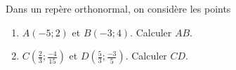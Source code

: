
Dans un repère orthonormal, on considère les points 
\begin{enumerate}
\item $A(-5;2)$ et $B(-3;4)$. Calculer $AB$.
\item $C \left( \frac{2}{3}; \frac{-4}{15} \right)$ et $D \left( \frac{5}{3}; \frac{-3}{5} \right)$. Calculer $CD$.
\end{enumerate}

 